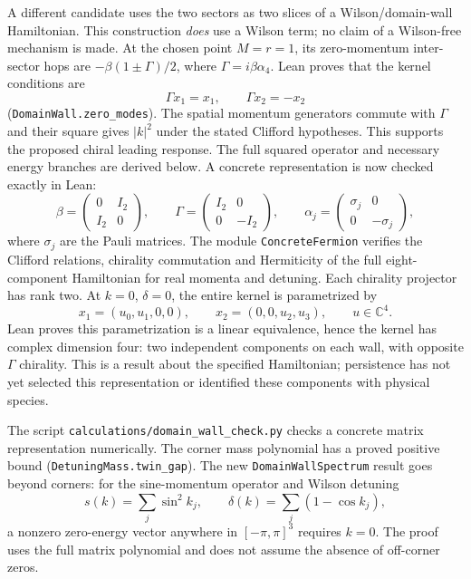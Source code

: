 A different candidate uses the two sectors as two slices of a Wilson/domain-wall Hamiltonian. This construction \emph{does} use a Wilson term; no claim of a Wilson-free mechanism is made. At the chosen point $M=r=1$, its zero-momentum inter-sector hops are $-\beta(1\pm\Gamma)/2$, where $\Gamma=i\beta\alpha_4$. Lean proves that the kernel conditions are
\begin{equation}
 \Gamma x_1=x_1,\qquad \Gamma x_2=-x_2
\end{equation}
(\nolinkurl{DomainWall.zero_modes}). The spatial momentum generators commute with $\Gamma$ and their square gives $|k|^2$ under the stated Clifford hypotheses. This supports the proposed chiral leading response. The full squared operator and necessary energy branches are derived below. A concrete representation is now checked exactly in Lean:
\begin{equation}
 \beta=\begin{pmatrix}0&I_2\\I_2&0\end{pmatrix},\qquad
 \Gamma=\begin{pmatrix}I_2&0\\0&-I_2\end{pmatrix},\qquad
 \alpha_j=\begin{pmatrix}\sigma_j&0\\0&-\sigma_j\end{pmatrix},
\end{equation}
where $\sigma_j$ are the Pauli matrices. The module \nolinkurl{ConcreteFermion} verifies the Clifford relations, chirality commutation and Hermiticity of the full eight-component Hamiltonian for real momenta and detuning. Each chirality projector has rank two. At $k=0$, $\delta=0$, the entire kernel is parametrized by
\begin{equation}
 x_1=(u_0,u_1,0,0),\qquad x_2=(0,0,u_2,u_3),\qquad u\in\mathbb C^4.
\end{equation}
Lean proves this parametrization is a linear equivalence, hence the kernel has complex dimension four: two independent components on each wall, with opposite $\Gamma$ chirality. This is a result about the specified Hamiltonian; persistence has not yet selected this representation or identified these components with physical species.

The script \nolinkurl{calculations/domain_wall_check.py} checks a concrete matrix representation numerically. The corner mass polynomial has a proved positive bound (\nolinkurl{DetuningMass.twin_gap}). The new \nolinkurl{DomainWallSpectrum} result goes beyond corners: for the sine-momentum operator and Wilson detuning
\begin{equation}
 s(k)=\sum_j\sin^2 k_j,\qquad \delta(k)=\sum_j(1-\cos k_j),
\end{equation}
a nonzero zero-energy vector anywhere in $[-\pi,\pi]^3$ requires $k=0$. The proof uses the full matrix polynomial and does not assume the absence of off-corner zeros.

